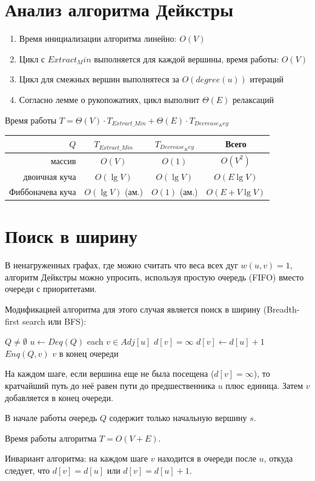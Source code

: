 \documentclass[11pt]{article}
\begin{document}
\section{Анализ алгоритма Дейкстры}
\begin{enumerate}
\item Время инициализации алгоритма линейно: $O(V)$
\item Цикл с $Extract_Min$ выполняется для каждой вершины, время работы: $O(V)$
\item Цикл для смежных вершин выполнятеся за $O(degree(u))$ итераций
\item Согласно лемме о рукопожатиях, цикл выполнит $\Theta(E)$ релаксаций
\end{enumerate}
Время работы $T = \Theta(V) \cdot T_{Extract\_Min} + \Theta(E) \cdot T_{Decrease_Key}$
\begin{center}
\begin{tabular}{|r|c|c|c|}
  \hline
     $Q$ & $T_{Extract\_Min}$ & $T_{Decrease_Key}$ & Всего \\
  \hline
      массив & $O(V)$ & $O(1)$ & $O(V^2)$ \\
  \hline
      двоичная куча & $O(\lg V)$ & $O(\lg V)$ & $O(E \lg V)$ \\
  \hline
      Фиббоначева куча & $O(\lg V)$ (ам.) & $O(1)$ (ам.) & $O(E + V \lg V)$ \\
  \hline
\end{tabular}
\end{center}

\section{Поиск в ширину}
В ненагруженных графах, где можно считать что веса всех дуг $w(u, v) = 1$, алгоритм Дейкстры можно упросить, используя простую очередь (FIFO) вместо очереди с приоритетами.

Модификацией алгоритма для этого случая является поиск в ширину (Breadth-first search или BFS):
\begin{codebox}
\li \While $Q \neq \emptyset$
\li     \Do $u \gets Deq(Q)$
\li         \For each $v \in Adj[u]$
\li             \Do \If $d[v] = \infty$
\li                 \Then $d[v] \gets d[u] + 1$
\li                       $Enq(Q, v)$ \Comment $v$ в конец очереди
                    \End
            \End
    \End
\end{codebox}
На каждом шаге, если вершина еще не была посещена ($d[v] = \infty$), то кратчайший путь до неё равен пути до предшественника $u$ плюс единица. Затем $v$ добавляется в конец очереди.

В начале работы очередь $Q$ содержит только начальную вершину $s$.

Время работы алгоритма $T = O(V+E)$.

Инвариант алгоритма: на каждом шаге $v$ находится в очереди после $u$, откуда следует, что $d[v] = d[u]$ или $d[v] = d[u] +1$.
\end{document}
